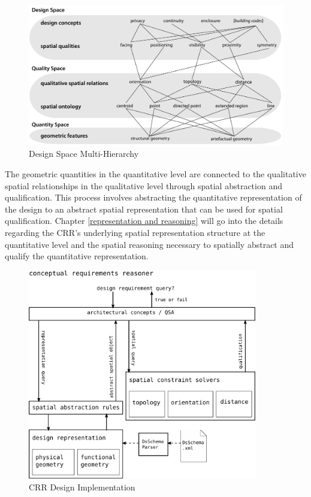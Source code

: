\documentclass[12pt]{ucthesis}
\begin{document}

\begin{figure}[t]
\centering
\includegraphics[width=140mm]{spatial-qualities-hierarchy}
\caption{Design Space Multi-Hierarchy}
\label{hierarchy}
\end{figure}

The geometric quantities in the quantitative level are connected to the qualitative spatial relationships in the qualitative level through spatial abstraction and qualification. This process involves abstracting the quantitative representation of the design to an abstract spatial representation that can be used for spatial qualification. Chapter \ref{representation and reasoning}  will go into the details regarding the CRR's underlying spatial representation structure at the quantitative level and the spatial reasoning necessary to spatially abstract and qualify the quantitative representation.  

\begin{figure}[t]
\centering
\includegraphics[width=100mm]{design}
\caption{CRR Design Implementation}
\label{crr design implementation}
\end{figure}
\end{document}
